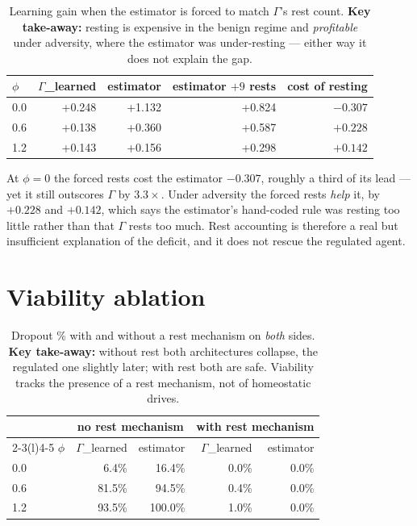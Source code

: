 \documentclass{article}
\begin{document}
\begin{table}[H]
  \caption{Learning gain when the estimator is forced to match $\Gamma$'s rest count. \textbf{Key take-away:} resting is expensive in the benign regime and \emph{profitable} under adversity, where the estimator was under-resting --- either way it does not explain the gap.}
  \centering\small
  \begin{tabular}{lrrrr}
    \toprule
    $\phi$ & $\Gamma$\_learned & estimator & estimator $+9$ rests & cost of resting \\
    \midrule
    0.0 & +0.248 & +1.132 & +0.824 & $-0.307$ \\
    0.6 & +0.138 & +0.360 & +0.587 & $+0.228$ \\
    1.2 & +0.143 & +0.156 & +0.298 & $+0.142$ \\
    \bottomrule
  \end{tabular}
\end{table}

At $\phi{=}0$ the forced rests cost the estimator $-0.307$, roughly a third of its lead --- yet it still outscores $\Gamma$ by $3.3\times$. Under adversity the forced rests \emph{help} it, by $+0.228$ and $+0.142$, which says the estimator's hand-coded rule was resting too little rather than that $\Gamma$ rests too much. Rest accounting is therefore a real but insufficient explanation of the deficit, and it does not rescue the regulated agent.

\section{Viability ablation}
\label{app:viability}
\begin{table}[H]
  \caption{Dropout \% with and without a rest mechanism on \emph{both} sides. \textbf{Key take-away:} without rest both architectures collapse, the regulated one slightly later; with rest both are safe. Viability tracks the presence of a rest mechanism, not of homeostatic drives.}
  \centering\small
  \begin{tabular}{lrrrr}
    \toprule
    & \multicolumn{2}{c}{no rest mechanism} & \multicolumn{2}{c}{with rest mechanism} \\
    \cmidrule(r){2-3}\cmidrule(l){4-5}
    $\phi$ & $\Gamma$\_learned & estimator & $\Gamma$\_learned & estimator \\
    \midrule
    0.0 & 6.4\% & 16.4\% & 0.0\% & 0.0\% \\
    0.6 & 81.5\% & 94.5\% & 0.4\% & 0.0\% \\
    1.2 & 93.5\% & 100.0\% & 1.0\% & 0.0\% \\
    \bottomrule
  \end{tabular}
\end{table}
\end{document}
